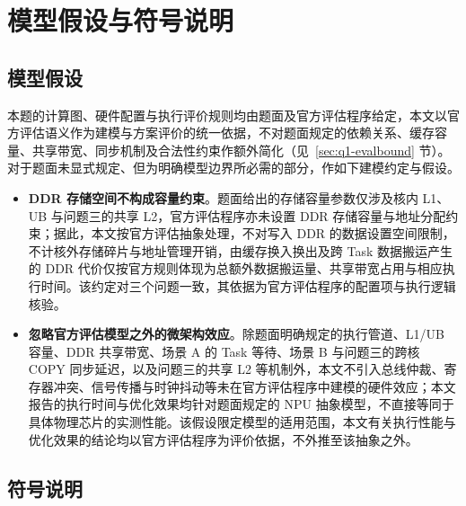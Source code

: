\section{模型假设与符号说明}\label{sec:assumptions-notation}

\subsection{模型假设}\label{sec:assumptions}
本题的计算图、硬件配置与执行评价规则均由题面及官方评估程序给定，本文以官方评估语义作为建模与方案评价的统一依据，不对题面规定的依赖关系、缓存容量、共享带宽、同步机制及合法性约束作额外简化（见~\ref{sec:q1-evalbound} 节）。对于题面未显式规定、但为明确模型边界所必需的部分，作如下建模约定与假设。

\begin{itemize}
\item \textbf{DDR 存储空间不构成容量约束}。题面给出的存储容量参数仅涉及核内 L1、UB 与问题三的共享 L2，官方评估程序亦未设置 DDR 存储容量与地址分配约束；据此，本文按官方评估抽象处理，不对写入 DDR 的数据设置空间限制，不计核外存储碎片与地址管理开销，由缓存换入换出及跨 Task 数据搬运产生的 DDR 代价仅按官方规则体现为总额外数据搬运量、共享带宽占用与相应执行时间。该约定对三个问题一致，其依据为官方评估程序的配置项与执行逻辑核验。
\item \textbf{忽略官方评估模型之外的微架构效应}。除题面明确规定的执行管道、L1/UB 容量、DDR 共享带宽、场景 A 的 Task 等待、场景 B 与问题三的跨核 COPY 同步延迟，以及问题三的共享 L2 等机制外，本文不引入总线仲裁、寄存器冲突、信号传播与时钟抖动等未在官方评估程序中建模的硬件效应；本文报告的执行时间与优化效果均针对题面规定的 NPU 抽象模型，不直接等同于具体物理芯片的实测性能。该假设限定模型的适用范围，本文有关执行性能与优化效果的结论均以官方评估程序为评价依据，不外推至该抽象之外。
\end{itemize}

\subsection{符号说明}\label{sec:notation}
